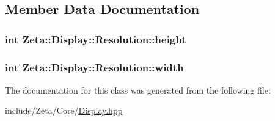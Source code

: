 \subsection{Member Data Documentation}
\hypertarget{classZeta_1_1Display_1_1Resolution_aa2abad33f7824c1b9cf36965825b564b}{
\subsubsection[{height}]{\setlength{\rightskip}{0pt plus 5cm}int Zeta\+::\+Display\+::\+Resolution\+::height}}\label{classZeta_1_1Display_1_1Resolution_aa2abad33f7824c1b9cf36965825b564b}
\hypertarget{classZeta_1_1Display_1_1Resolution_a56351470d4c2084ffe9d8273d4cd86d2}{
\subsubsection[{width}]{\setlength{\rightskip}{0pt plus 5cm}int Zeta\+::\+Display\+::\+Resolution\+::width}}\label{classZeta_1_1Display_1_1Resolution_a56351470d4c2084ffe9d8273d4cd86d2}


The documentation for this class was generated from the following file\+:\begin{DoxyCompactItemize}
\item 
include/\+Zeta/\+Core/\hyperlink{Display_8hpp}{Display.\+hpp}\end{DoxyCompactItemize}
